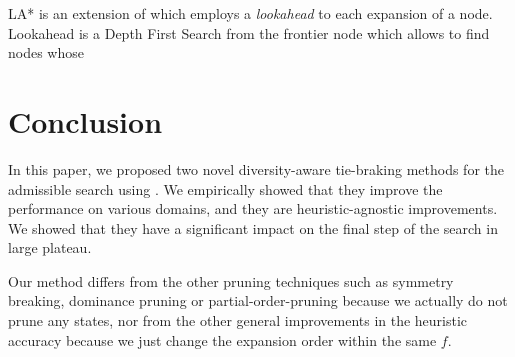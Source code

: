 LA* is an extension of \astar which employs a \emph{lookahead} to each
expansion of a node. Lookahead is a Depth First Search from the frontier
node which allows to find nodes whose 

\section{Conclusion}

In this paper, we proposed two novel diversity-aware tie-braking methods for the admissible search using \astar. We empirically showed that they improve the performance on various domains, and they are heuristic-agnostic improvements. We showed that they have a significant impact on the final step of the search in large plateau.

Our method differs from the other pruning techniques such as symmetry breaking, dominance pruning or partial-order-pruning because we actually do not prune any states, nor from the other general improvements in the heuristic accuracy because we just change the expansion order within the same $f$.
